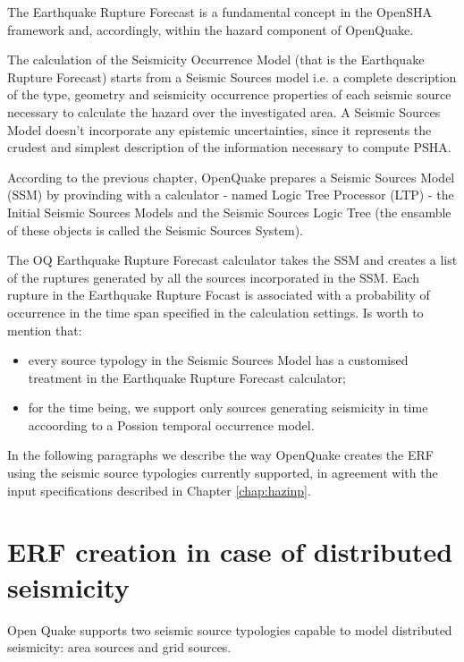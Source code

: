 The Earthquake Rupture Forecast is a fundamental concept in the OpenSHA framework and, accordingly, within the hazard component of OpenQuake.

%
The calculation of the Seismicity Occurrence Model (that is the Earthquake Rupture Forecast) starts from a Seismic Sources model i.e. a complete description of the type, geometry and seismicity occurrence properties of each seismic source necessary to calculate the hazard over the investigated area. A Seismic Sources Model doesn't incorporate any epistemic uncertainties, since it represents the crudest and simplest description of the information necessary to compute PSHA.

%
According to the previous chapter, OpenQuake prepares a Seismic Sources Model (SSM) by provinding with a calculator - named Logic Tree Processor (LTP) - the Initial Seismic Sources Models and the Seismic Sources Logic Tree (the ensamble of these objects is called the Seismic Sources System).

%
The OQ Earthquake Rupture Forecast calculator takes the SSM and creates a list of the ruptures generated by all the sources incorporated in the SSM. Each rupture in the Earthquake Rupture Focast is associated with a probability of occurrence in the time span specified in the calculation settings. 
Is worth to mention that: 
\begin{itemize}
\item every source typology in the Seismic Sources Model has a customised treatment in the Earthquake Rupture Forecast calculator;
\item for the time being, we support only sources generating seismicity in time accoording to a Possion temporal occurrence model.
\end{itemize}

%
In the following paragraphs we describe the way OpenQuake creates the ERF using the  seismic source typologies currently supported, in agreement with the input specifications described in Chapter \ref{chap:hazinp}.
%
\section{ERF creation in case of distributed seismicity}
Open Quake supports two seismic source typologies capable to model distributed seismicity: area sources and grid sources.

